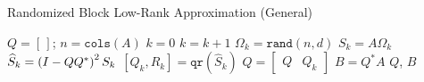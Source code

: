 \begin{algorithm}[t]
\caption{Randomized Block Low-Rank Approximation (General)}
\label{alg:rand_low_rank}
\begin{algorithmic}[1]
    \State $Q = [\,]$; $n = \texttt{cols}(A)$
    \State $k=0$
        \State $k = k + 1$
        \State $\Omega_{k} = \texttt{rand}(n,d)$
        \State $S_{k} = A\Omega_{k}$
        \State $\widehat{S}_{k} = \left( I - QQ^{*} \right)^{2}S_{k}$
        \label{alg_line:rand_Gen_GS}
        \State $[Q_{k},R_{k}] = \texttt{qr}(\widehat{S}_{k})$
        \State $Q = \begin{bmatrix}Q & Q_{k}\end{bmatrix}$
    \EndWhile
\State $B = Q^{*}A$
\State \Return $Q$, $B$
\EndFunction
\end{algorithmic}
\end{algorithm}
